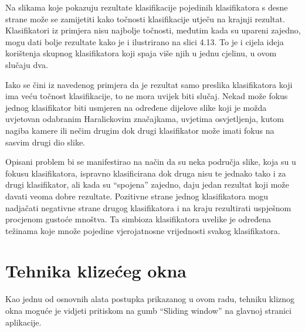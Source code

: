 \documentclass[times, utf8, zavrsni]{fer}
\begin{document}
\newpage

Na slikama koje pokazuju rezultate klasifikacije pojedinih klasifikatora s 
desne strane može se zamijetiti kako točnosti klasifikacije utječu na
krajnji rezultat. Klasifikatori iz primjera nisu najbolje točnosti, 
međutim kada su upareni zajedno, mogu dati bolje rezultate kako je 
i ilustrirano na slici 4.13. To je i cijela ideja korištenja skupnog
klasifikatora koji spaja više njih u jednu cjelinu, u ovom slučaju
dva. 

\bigbreak

Iako se čini iz navedenog primjera da je rezultat samo preslika 
klasifikatora koji ima veću točnost klasifikacije, to ne mora uvijek 
biti slučaj. Nekad može fokus jednog klasifikator biti usmjeren 
na određene dijelove slike koji je možda uvjetovan odabranim 
Haralickovim značajkama, uvjetima osvjetljenja, kutom nagiba kamere ili 
nečim drugim dok drugi klasifikator može imati fokus na sasvim drugi 
dio slike. 

\bigbreak

Opisani problem bi se manifestirao na način da su neka 
područja slike, koja su u fokusu klasifikatora, ispravno klasificirana 
dok druga nisu te jednako tako i za drugi klasifikator, ali kada
su \enquote{spojena} zajedno, daju jedan rezultat koji može davati veoma
dobre rezultate. Pozitivne strane jednog klasifikatora mogu nadjačati 
negativne strane drugog klasifikatora i na kraju rezultirati uspješnom
procjenom gustoće mnoštva. Ta simbioza klasifikatora uvelike je određena 
težinama koje množe pojedine vjerojatnosne vrijednosti svakog klasifikatora.


\chapter{Tehnika klizećeg okna}

Kao jednu od osnovnih alata postupka prikazanog u ovom radu, tehniku
kliznog okna moguće je vidjeti pritiskom na gumb \enquote{Sliding window}
na glavnoj stranici aplikacije. 

\bigbreak
\end{document}
